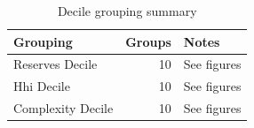 \begin{table}[htbp]
\centering
\caption{Decile grouping summary}
\label{tab:decile_tests}
\begin{tabular}{lrl}
\toprule
\textbf{Grouping} & \textbf{Groups} & \textbf{Notes} \\
\midrule
Reserves Decile & 10 & See figures \\
Hhi Decile & 10 & See figures \\
Complexity Decile & 10 & See figures \\
\bottomrule
\end{tabular}
\end{table}
